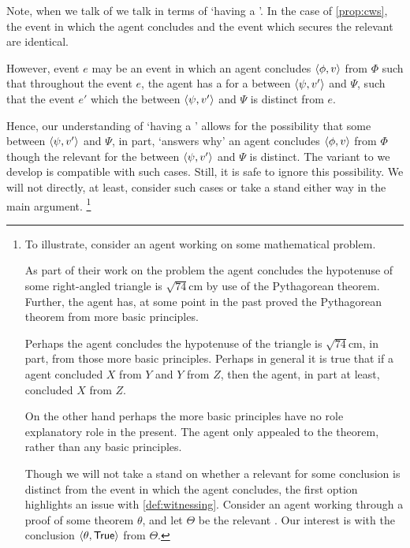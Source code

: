 \begin{note}
  Note, when we talk of  we talk in terms of `having a '.
  In the case of \autoref{prop:cws}, the event in which the agent concludes and the event which secures the relevant \wit{} are identical.

  However, event \(e\) may be an event in which an agent concludes \(\langle \phi, v \rangle\) from \(\Phi\) such that throughout the event \(e\), the agent has a \wit{} for a \ros{} between \(\langle \psi, v' \rangle\) and \(\Psi\), such that the event \(e'\) which  the \ros{} between \(\langle \psi, v' \rangle\) and \(\Psi\) is distinct from \(e\).

  Hence, our understanding of `having a ' allows for the possibility that some \ros{} between \(\langle \psi, v' \rangle\) and \(\Psi\), in part, `answers why' an agent concludes \(\langle \phi, v \rangle\) from \(\Phi\) though the relevant  for the \ros{} between \(\langle \psi, v' \rangle\) and \(\Psi\) is distinct.
  The variant to \issueInclusion{} we develop is compatible with such cases.
  Still, it is safe to ignore this possibility.
  We will not directly, at least, consider such cases or take a stand either way in the main argument.%
  \footnote{
    To illustrate, consider an agent working on some mathematical problem.

    As part of their work on the problem the agent concludes the hypotenuse of some right-angled triangle is \(\sqrt{74}\text{cm}\) by use of the Pythagorean theorem.
    Further, the agent has, at some point in the past proved the Pythagorean theorem from more basic principles.

    Perhaps the agent concludes the hypotenuse of the triangle is \(\sqrt{74}\text{cm}\), in part, from those more basic principles.
    Perhaps in general it is true that if a agent concluded \(X\) from \(Y\) and \(Y\) from \(Z\), then the agent, in part at least, concluded \(X\) from \(Z\).

    On the other hand perhaps the more basic principles have no role explanatory role in the present.
    The agent only appealed to the theorem, rather than any basic principles.

    Though we will not take a stand on whether a relevant  for some conclusion is distinct from the event in which the agent concludes, the first option highlights an issue with \autoref{def:witnessing}.
    Consider an agent working through a proof of some theorem \(\theta\), and let \(\Theta\) be the relevant \pool{}.
    Our interest is with the conclusion \(\pv{\theta}{\valI{True}}\) from \(\Theta\).

}
\end{note}
